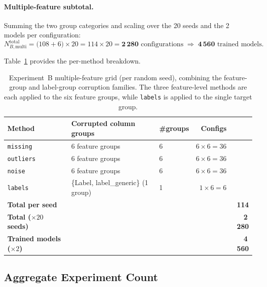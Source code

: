 \documentclass[../main.tex]{subfiles}
\begin{document}
\paragraph{Multiple-feature subtotal.}
Summing the two group categories and scaling over the 20 seeds and the 2 models per configuration:
\[
    N_{B,\text{multi}}^{\text{total}} = \bigl(108 + 6\bigr) \times 20 = 114 \times 20 = \mathbf{2\,280} \text{ configurations}
    \;\Longrightarrow\; \mathbf{4\,560} \text{ trained models}.
\]

Table~\ref{tab:grid-B-multi} provides the per-method breakdown.

\begin{table}[H]
\centering
\caption{Experiment~B multiple-feature grid (per random seed), combining the feature-group and label-group corruption families. The three feature-level methods are each applied to the six feature groups, while \texttt{labels} is applied to the single target group.}
\label{tab:grid-B-multi}
\small
\begin{tabular}{lllrr}
\toprule
\textbf{Method}    & \textbf{Corrupted column groups}        & \textbf{\#groups} & \textbf{Configs} \\
\midrule
\texttt{missing}   & 6 feature groups                        & 6                 & $6 \times 6 = 36$ \\
\texttt{outliers}  & 6 feature groups                        & 6                 & $6 \times 6 = 36$ \\
\texttt{noise}     & 6 feature groups                        & 6                 & $6 \times 6 = 36$ \\
\texttt{labels}    & \{Label, label\_generic\} (1 group)     & 1                 & $1 \times 6 = 6$  \\
\midrule
\textbf{Total per seed} & &                                       &                 & \textbf{114} \\
\textbf{Total ($\times 20$ seeds)} & &                          &                 & \textbf{2\,280} \\
\textbf{Trained models ($\times 2$)} & &                        &                 & \textbf{4\,560} \\
\bottomrule
\end{tabular}
\end{table}

\newpage
\subsection{Aggregate Experiment Count}
\label{sec:exp-totals}
\end{document}
